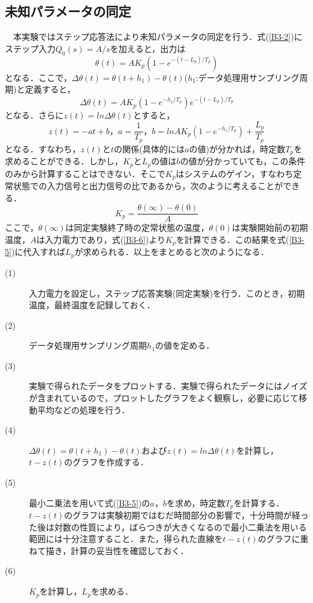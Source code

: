 \documentclass[12pt]{jsarticle}
\begin{document}
\subsection{未知パラメータの同定}
　本実験ではステップ応答法により未知パラメータの同定を行う．式(\ref{B3-2})にステップ入力$Q_0(s) = A/s$を加えると，出力は
\begin{equation}
  \label{B3-3}
  \theta(t) = AK_p(1-e^{-(t-L_p)/T_p})
\end{equation}
となる．ここで，$\Delta\theta(t)=\theta(t+h_1)-\theta(t)$($h_1$:データ処理用サンプリング周期)と定義すると，
\begin{equation}
  \label{B3-4}
  \Delta\theta(t) = AK_p(1-e^{-h_1/T_p})e^{-(t-L_p)/T_p}
\end{equation}
となる．さらに$z(t)=ln\Delta\theta(t)$とすると，
\begin{equation}
  \label{B3-5}
  z(t) = -at+b， a = \frac{1}{T_p}， b = ln{AK_p(1-e^{-h_1/T_p})} + \frac{L_p}{T_p}
\end{equation}
となる．すなわち，$z(t)$と$t$の関係(具体的には$a$の値)が分かれば，時定数$T_p$を求めることができる．しかし，$K_p$と$L_p$の値は$b$の値が分かっていても，この条件のみから計算することはできない．そこで$K_p$はシステムのゲイン，すなわち定常状態での入力信号と出力信号の比であるから，次のように考えることができる．
\begin{equation}
  \label{B3-6}
  K_p=\frac{\theta(\infty) - \theta(0)}{A}
\end{equation}
ここで，$\theta(\infty)$は同定実験終了時の定常状態の温度，$\theta(0)$は実験開始前の初期温度，$A$は入力電力であり，式(\ref{B3-6})より$K_p$を計算できる．この結果を式(\ref{B3-5})に代入すれば$L_p$が求められる．以上をまとめると次のようになる．
\begin{description}
  \item[(1)]入力電力を設定し，ステップ応答実験(同定実験)を行う．このとき，初期温度，最終温度を記録しておく．
  \item[(2)]データ処理用サンプリング周期$h_1$の値を定める．
  \item[(3)]実験で得られたデータをプロットする．実験で得られたデータにはノイズが含まれているので，プロットしたグラフをよく観察し，必要に応じて移動平均などの処理を行う．
  \item[(4)]$\Delta\theta(t) = \theta(t+h_1)-\theta(t)$および$z(t)=ln\Delta\theta(t)$を計算し，$t-z(t)$のグラフを作成する．
  \item[(5)]最小二乗法を用いて式(\ref{B3-5})の$a，b$を求め，時定数$T_p$を計算する．$t-z(t)$のグラフは実験初期ではむだ時間部分の影響で，十分時間が経った後は対数の性質により，ばらつきが大きくなるので最小二乗法を用いる範囲には十分注意すること．また，得られた直線を$t-z(t)$のグラフに重ねて描き，計算の妥当性を確認しておく．
  \item[(6)]$K_p$を計算し，$L_p$を求める．
\end{description}
\end{document}
